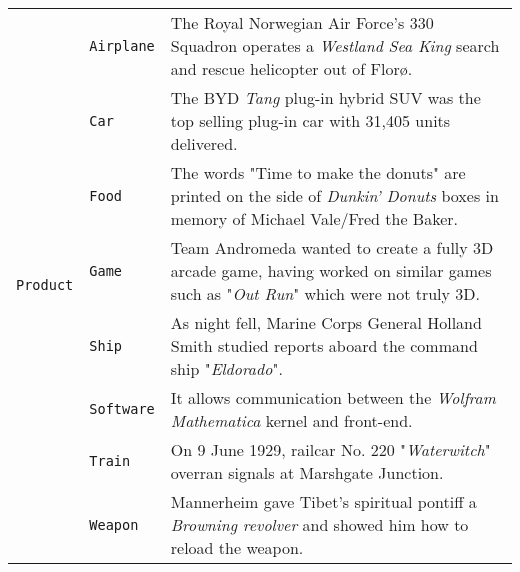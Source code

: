 \documentclass[11pt,a4paper, dvipsnames]{article}
\begin{document}
\begin{longtable}{clp{9.5cm}}
\multirow{9}{*}{\texttt{\color{Red}Product}}                      & \texttt{\color{Red}Airplane}            & The Royal Norwegian Air Force's 330 Squadron operates a \textit{\color{Red}Westland Sea King} search and rescue helicopter out of Florø.                           \\ \cmidrule(r){2-2} \cmidrule(r){3-3}
                                              & \texttt{\color{Red}Car}                 & The BYD \textit{\color{Red}Tang} plug-in hybrid SUV was the top selling plug-in car with 31,405 units delivered.                                                   \\ \cmidrule(r){2-2} \cmidrule(r){3-3}
                                              & \texttt{\color{Red}Food}             & The words "Time to make the donuts" are printed on the side of \textit{\color{Red}Dunkin' Donuts} boxes in memory of Michael Vale/Fred the Baker.                  \\ \cmidrule(r){2-2} \cmidrule(r){3-3}
                                              & \texttt{\color{Red}Game}                & Team Andromeda wanted to create a fully 3D arcade game, having worked on similar games such as "\textit{\color{Red}Out Run}" which were not truly 3D.              \\ \cmidrule(r){2-2} \cmidrule(r){3-3}
                                              & \texttt{\color{Red}Ship}                & As night fell, Marine Corps General Holland Smith studied reports aboard the command ship "\textit{\color{Red}Eldorado}".                                          \\ \cmidrule(r){2-2} \cmidrule(r){3-3}
                                              & \texttt{\color{Red}Software}            & It allows communication between the \textit{\color{Red}Wolfram Mathematica} kernel and front-end.                                                                  \\ \cmidrule(r){2-2} \cmidrule(r){3-3}
                                              & \texttt{\color{Red}Train}               & On 9 June 1929, railcar No. 220 "\textit{\color{Red}Waterwitch}" overran signals at Marshgate Junction.                                                            \\ \cmidrule(r){2-2} \cmidrule(r){3-3}
                                              & \texttt{\color{Red}Weapon}              & Mannerheim gave Tibet's spiritual pontiff a \textit{\color{Red}Browning revolver} and showed him how to reload the weapon.                                         \\ \cmidrule(r){2-2} \cmidrule(r){3-3}

\end{longtable}
\end{document}
